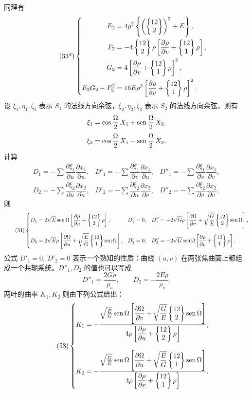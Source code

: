 同理有
\begin{equation}\tag{33*}
\left\{
\begin{aligned}
E_2&=4\rho^2\left\{\left(\left\{\begin{matrix}12\\2\end{matrix}\right\}\right)^2+E\right\},\\
F_2&=-4\left\{\begin{matrix}12\\2\end{matrix}\right\}\rho\left[\frac{\partial\rho}{\partial v}+\left\{\begin{matrix}12\\1\end{matrix}\right\}\rho\right],\\
G_2&=4\left[\frac{\partial\rho}{\partial v}+\left\{\begin{matrix}12\\1\end{matrix}\right\}\rho\right]^2,\\
E_2G_2-F_2^2&=16E\rho^2\left[\frac{\partial\rho}{\partial v}+\left\{\begin{matrix}12\\1\end{matrix}\right\}\rho\right]^2.
\end{aligned}
\right.
\end{equation}
设 \(\xi_1,\eta_1,\zeta_1\) 表示 \(S_1\) 的法线方向余弦，\(\xi_2,\eta_2,\zeta_2\) 表示 \(S_2\) 的法线方向余弦，则有
\[
 \xi_1=\cos\frac\Omega2\,X_1+\operatorname{sen}\frac\Omega2\,X_2,
\]
\[
 \xi_2=\cos\frac\Omega2\,X_1-\operatorname{sen}\frac\Omega2\,X_2.
\]
计算
\[
\begin{array}{lll}
D_1=-\sum\dfrac{\partial\xi_1}{\partial u}\dfrac{\partial x_1}{\partial u},&
D'_1=-\sum\dfrac{\partial\xi_1}{\partial v}\dfrac{\partial x_1}{\partial u},&
D''_1=-\sum\dfrac{\partial\xi_1}{\partial v}\dfrac{\partial x_1}{\partial v},\\[0.8em]
D_2=-\sum\dfrac{\partial\xi_2}{\partial u}\dfrac{\partial x_2}{\partial u},&
D'_2=-\sum\dfrac{\partial\xi_2}{\partial u}\dfrac{\partial x_2}{\partial v},&
D''_2=-\sum\dfrac{\partial\xi_2}{\partial v}\dfrac{\partial x_2}{\partial v},
\end{array}
\]
则
\begin{equation}\tag{34}
\left\{
\begin{aligned}
D_1&=2\sqrt E\operatorname{sen}\Omega\left[\frac{\partial\rho}{\partial u}+\left\{\begin{matrix}12\\2\end{matrix}\right\}\rho\right],
& D'_1&=0,
& D''_1&=-2\sqrt G\rho\left[\frac{\partial\Omega}{\partial v}+\sqrt{\frac GE}\left\{\begin{matrix}12\\2\end{matrix}\right\}\operatorname{sen}\Omega\right],\\[0.4em]
D_2&=2\sqrt E\rho\left[\frac{\partial\Omega}{\partial u}+\sqrt{\frac EG}\left\{\begin{matrix}12\\1\end{matrix}\right\}\operatorname{sen}\Omega\right],
& D'_2&=0,
& D''_2&=-2\sqrt G\operatorname{sen}\Omega\left[\frac{\partial\rho}{\partial v}+\left\{\begin{matrix}12\\1\end{matrix}\right\}\rho\right].
\end{aligned}
\right.
\end{equation}
公式 \(D'_1=0,\ D'_2=0\) 表示一个熟知的性质：曲线 \((u,v)\) 在两张焦曲面上都组成一个共轭系统。\(D''_1,D_2\) 的值也可以写成
\[
 D''_1=\frac{2G\rho}{\rho_u},\qquad D_2=-\frac{2E\rho}{\rho_v}.
\]
两叶的曲率 \(K_1,K_2\) 则由下列公式给出：
\begin{equation}\tag{53}
\left\{
\begin{aligned}
K_1&=-\frac{\sqrt{\frac EG}\operatorname{sen}\Omega\left[\dfrac{\partial\Omega}{\partial v}+\sqrt{\dfrac GE}\left\{\begin{matrix}12\\2\end{matrix}\right\}\operatorname{sen}\Omega\right]}
{4\rho\left[\dfrac{\partial\rho}{\partial u}+\left\{\begin{matrix}12\\2\end{matrix}\right\}\rho\right]},\\[0.8em]
K_2&=-\frac{\sqrt{\frac GE}\operatorname{sen}\Omega\left[\dfrac{\partial\Omega}{\partial u}+\sqrt{\dfrac EG}\left\{\begin{matrix}12\\1\end{matrix}\right\}\operatorname{sen}\Omega\right]}
{4\rho\left[\dfrac{\partial\rho}{\partial v}+\left\{\begin{matrix}12\\1\end{matrix}\right\}\rho\right]}.
\end{aligned}
\right.
\end{equation}

